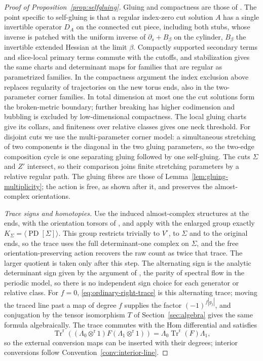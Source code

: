 \documentclass[11pt]{amsart}
\theoremstyle{definition}
\theoremstyle{remark}
\theoremstyle{plain}
\numberwithin{equation}{section}
\newcommand{\PD}{\operatorname{PD}}
\begin{document}
\begin{proof}[Proof of Proposition~\ref{prop:selfgluing}]
Gluing and compactness are those of \cite[Section~3.9]{KM-unknot}. The point
specific to self-gluing is that a regular index-zero cut solution $A$ has a
single invertible operator $D_A$ on the connected cut piece, including both
stubs, whose inverse is patched with the uniform inverse of
$\partial_s+B_\beta$ on the cylinder, $B_\beta$ the invertible extended
Hessian at the limit $\beta$. Compactly supported secondary terms and slice-local primary terms
commute with the cutoffs, and stabilization gives the same charts and determinant maps for
families that are regular as parametrized families. In the compactness argument the index exclusion
above replaces regularity of trajectories on the new torus ends, also in the
two-parameter corner families. In total dimension at most one the cut
solutions form the broken-metric boundary; further breaking has higher
codimension and bubbling is excluded by low-dimensional compactness. The
local gluing charts give its collars, and finiteness over relative classes
gives one neck threshold. For disjoint cuts we use the multi-parameter corner
model: a simultaneous stretching of two components is the diagonal in the two
gluing parameters, so the two-edge composition cycle is one separating gluing
followed by one self-gluing. The cuts $\Sigma$ and $Z'$ intersect, so their
comparison joins finite stretching parameters by a relative regular path. The
gluing fibres are those of Lemma~\ref{lem:gluing-multiplicity}; the action is
free, as shown after it, and preserves the almost-complex orientations.

\emph{Trace signs and homotopies.} Use the induced almost-complex structures
at the ends, with the orientation torsors of \cite[Section~5.1]{KM-unknot},
and apply \cite[Proposition~5.5]{KM-unknot} with the enlarged group exactly
$K_\Sigma=\langle\PD[\Sigma]\rangle$. This group restricts trivially to
$V^\circ$, to $\Sigma$ and to the original ends, so the trace uses the full
determinant-one complex on $\Sigma$, and the free orientation-preserving
action recovers the raw count as twice that trace. The larger quotient is
taken only after this step. The alternating sign is the analytic determinant
sign given by the argument of \cite[Lemma~2.4]{KM-sutures}, the parity of
spectral flow in the periodic model, so there is no independent sign choice
for each generator or relative class. For $f=0$,
\eqref{eq:ordinary-right-trace} is this alternating trace; moving the traced
line past a map of degree $f$ supplies the factor $(-1)^{f|g_j|}$, and
conjugation by the tensor isomorphism $T$ of Section~\ref{sec:algebra} gives
the same formula algebraically. The trace commutes with the Hom differential
and satisfies
\[
 \operatorname{Tr}^{\mathrm r}((\Lambda_0\otimes^{\mathrm r}1)F(\Lambda_1\otimes^{\mathrm r}1))
 =\Lambda_0\operatorname{Tr}^{\mathrm r}(F)\Lambda_1,
\]
so the external conversion maps can be inserted with their degrees; interior
conversions follow Convention~\ref{conv:interior-line}.


\end{proof}
\end{document}
